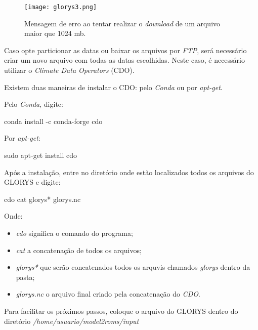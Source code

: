 \begin{figure}[H]
    \centering
    \texttt{[image: glorys3.png]}
    \caption{Mensagem de erro ao tentar realizar o \textit{download} de um arquivo maior que 1024 mb.}
    \label{glorys3}
\end{figure}
\bigskip


\noindent Caso opte particionar as datas ou baixar os arquivos por \textit{FTP}, será necessário criar um novo arquivo com todas as datas escolhidas. Neste caso, é necessário utilizar o \textit{Climate Data Operators} (CDO). 
\bigskip

\noindent Existem duas maneiras de  instalar o CDO: pelo \textit{Conda} ou por \textit{apt-get}.
\bigskip

\noindent Pelo \textit{Conda}, digite:
\bigskip

\begin{bashcode}
conda install -c conda-forge cdo
\end{bashcode}
\bigskip

\noindent Por \textit{apt-get}:
\bigskip

\begin{bashcode}
sudo apt-get install cdo
\end{bashcode}
\bigskip

\noindent Após a instalação, entre no diretório onde estão localizados todos os arquivos do GLORYS e digite:
\bigskip

\begin{bashcode}
cdo cat glorys* glorys.nc
\end{bashcode}
\bigskip

\noindent Onde: 
\bigskip

\begin{itemize}
    \item  \textit{cdo} significa o comando do programa;
    \item \textit{cat} a concatenação de todos os arquivos;
    \item \textit{glorys*} que serão concatenados todos os arquvis chamados \textit{glorys} dentro da pasta; 
    \item \textit{glorys.nc} o arquivo final criado pela concatenação do \textit{CDO}.
\end{itemize}

\begin{tcolorbox}[enhanced,
    grow to left by   = 0cm,
    grow to right by  = 0cm,
    enlarge top by    = 0cm,
    enlarge bottom by = 0cm,
    tcbox raise base,
    boxrule           = 1.0pt,
    left              = 18mm,
    colframe          = red!50!black,coltext=red!25!black,colback=red!10!white,
    overlay           = {\begin{tcbclipinterior}\fill[red!75!blue!50!white] (frame.south west)
      rectangle node[text=white,font=\sffamily\bfseries\footnotesize,rotate=0] {ATENÇÃO} ([xshift=18mm]frame.north west);\end{tcbclipinterior}}]
  Para facilitar os próximos passos, coloque o arquivo do GLORYS dentro do diretório \textit{/home/usuario/model2roms/input}
\end{tcolorbox}

